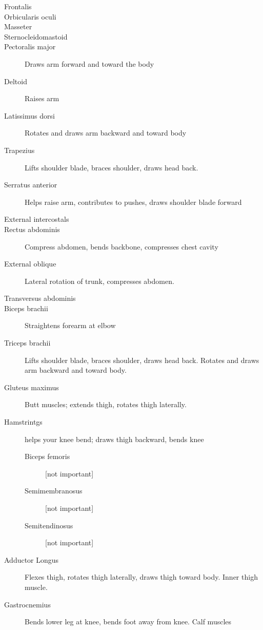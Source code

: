 \documentclass[11pt]{article}
\begin{document}
\begin{enumerate}
\begin{enumerate}
\begin{description}
\item[{Frontalis}] 

\item[{Orbicularis oculi}] 

\item[{Masseter}] 


\item[{Sternocleidomastoid}] 

\item[{Pectoralis major}] Draws arm forward and toward the body
\item[{Deltoid}] Raises arm
\item[{Latissimus dorsi}] Rotates and draws arm backward and toward body
\item[{Trapezius}] Lifts shoulder blade, braces shoulder, draws head back.
\item[{Serratus anterior}] Helps raise arm, contributes to pushes, draws
shoulder blade forward

\item[{External intercostals}] 

\item[{Rectus abdominis}] Compress abdomen, bends backbone, compresses chest
cavity
\item[{External oblique}] Lateral rotation of trunk, compresses abdomen.
\item[{Transversus abdominis}] 

\item[{Biceps brachii}] Straightens forearm at elbow
\item[{Triceps brachii}] Lifts shoulder blade, braces shoulder, draws head back.
Rotates and draws arm backward and toward body.

\item[{Gluteus maximus}] Butt muscles; extends thigh, rotates thigh laterally.
\item[{Hamstrintgs}] helps your knee bend; draws thigh backward, bends knee
\begin{description}
\item[{Biceps femoris}] [not important]
\item[{Semimembranosus}] [not important]
\item[{Semitendinosus}] [not important]
\end{description}
\item[{Adductor Longus}] Flexes thigh, rotates thigh laterally, draws thigh
toward body. Inner thigh muscle.
\item[{Gastrocnemius}] Bends lower leg at knee, bends foot away from knee. Calf
muscles


\end{description}
\end{enumerate}
\end{enumerate}
\end{document}
